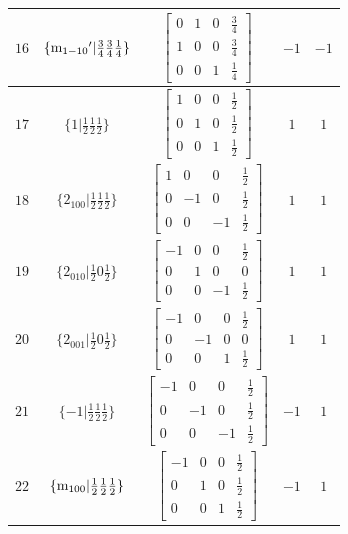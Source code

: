 \documentclass[fleqn,8pt]{jsarticle}
\begin{document}
\begin{longtable}{ccccc}
$ 16 $ & $ \{{\rm m}_{1-10}{}'|\frac{3}{4} \frac{3}{4} \frac{1}{4}\} $ & $ \begin{bmatrix} 0 & 1 & 0 & \frac{3}{4} \\ 1 & 0 & 0 & \frac{3}{4} \\ 0 & 0 & 1 & \frac{1}{4} \end{bmatrix} $ & $ -1 $ & $ -1 $ \\ \hline
$ 17 $ & $ \{1|\frac{1}{2} \frac{1}{2} \frac{1}{2}\} $ & $ \begin{bmatrix} 1 & 0 & 0 & \frac{1}{2} \\ 0 & 1 & 0 & \frac{1}{2} \\ 0 & 0 & 1 & \frac{1}{2} \end{bmatrix} $ & $ 1 $ & $ 1 $ \\ \hline
$ 18 $ & $ \{2{}_{100}|\frac{1}{2} \frac{1}{2} \frac{1}{2}\} $ & $ \begin{bmatrix} 1 & 0 & 0 & \frac{1}{2} \\ 0 & -1 & 0 & \frac{1}{2} \\ 0 & 0 & -1 & \frac{1}{2} \end{bmatrix} $ & $ 1 $ & $ 1 $ \\ \hline
$ 19 $ & $ \{2{}_{010}|\frac{1}{2} 0 \frac{1}{2}\} $ & $ \begin{bmatrix} -1 & 0 & 0 & \frac{1}{2} \\ 0 & 1 & 0 & 0 \\ 0 & 0 & -1 & \frac{1}{2} \end{bmatrix} $ & $ 1 $ & $ 1 $ \\ \hline
$ 20 $ & $ \{2{}_{001}|\frac{1}{2} 0 \frac{1}{2}\} $ & $ \begin{bmatrix} -1 & 0 & 0 & \frac{1}{2} \\ 0 & -1 & 0 & 0 \\ 0 & 0 & 1 & \frac{1}{2} \end{bmatrix} $ & $ 1 $ & $ 1 $ \\ \hline
$ 21 $ & $ \{-1|\frac{1}{2} \frac{1}{2} \frac{1}{2}\} $ & $ \begin{bmatrix} -1 & 0 & 0 & \frac{1}{2} \\ 0 & -1 & 0 & \frac{1}{2} \\ 0 & 0 & -1 & \frac{1}{2} \end{bmatrix} $ & $ -1 $ & $ 1 $ \\ \hline
$ 22 $ & $ \{{\rm m}_{100}|\frac{1}{2} \frac{1}{2} \frac{1}{2}\} $ & $ \begin{bmatrix} -1 & 0 & 0 & \frac{1}{2} \\ 0 & 1 & 0 & \frac{1}{2} \\ 0 & 0 & 1 & \frac{1}{2} \end{bmatrix} $ & $ -1 $ & $ 1 $ \\ \hline

\end{longtable}
\end{document}
